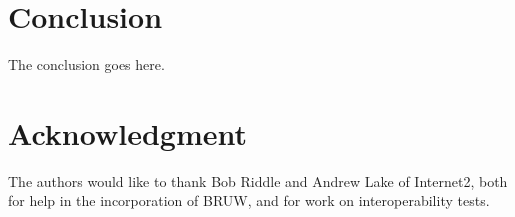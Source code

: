 \documentclass[conference]{IEEEtran}
\begin{document}
\section{Conclusion}
The conclusion goes here.


\section*{Acknowledgment}
The authors would like to thank Bob Riddle and Andrew Lake of Internet2, both
for help in the incorporation of BRUW, and for work on interoperability tests.



%
%
%

\end{document}
